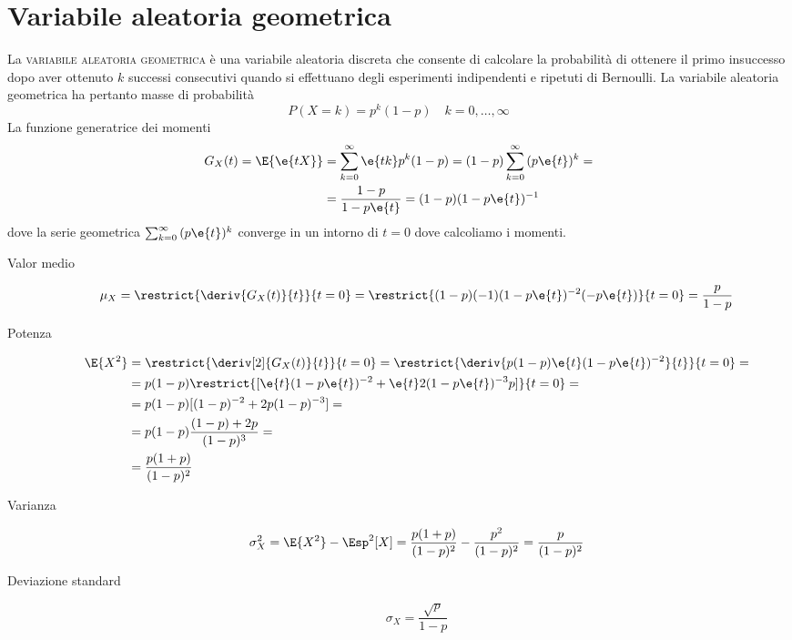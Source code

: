 \section{Variabile aleatoria geometrica}
La \textsc{variabile aleatoria geometrica} è una variabile aleatoria discreta che consente di calcolare la probabilità di ottenere il primo insuccesso dopo aver ottenuto $k$ successi consecutivi quando si effettuano degli esperimenti indipendenti e ripetuti di Bernoulli.
La variabile aleatoria geometrica ha pertanto masse di probabilità
\begin{equation}
	P(X=k)=p^k(1-p)\quad k=0,\dots,\infty
\end{equation}
La funzione generatrice dei momenti
\begin{equation}
\begin{split}
	G_X(t)=\E{\e{t X}}&=\sum_{k=0}^{\infty}{\e{t k}p^k(1-p)}=(1-p)\sum_{k=0}^{\infty}{(p\e{t})^k}=\\
	&=\frac{1-p}{1-p\e{t}}=(1-p)(1-p\e{t})^{-1}
\end{split}
\end{equation}
dove la serie geometrica $\sum_{k=0}^{\infty}{(p\e{t})^k}$ converge in un intorno di $t=0$ dove calcoliamo i momenti.

\begin{description}
\item[Valor medio]
\begin{equation}
	\mu_X=\restrict{\deriv{G_X(t)}{t}}{t=0}=\restrict{(1-p)(-1)(1-p\e{t})^{-2}(-p\e{t})}{t=0}=\frac{p}{1-p}
\end{equation}
\item[Potenza]
\begin{equation}
\begin{split}
	\E{X^2}&=\restrict{\deriv[2]{G_X(t)}{t}}{t=0}=\restrict{\deriv{p(1-p)\e{t}(1-p\e{t})^{-2}}{t}}{t=0}=\\
	&=p(1-p)\restrict{[\e{t}(1-p\e{t})^{-2}+\e{t}2(1-p\e{t})^{-3}p]}{t=0}=\\
	&=p(1-p)[(1-p)^{-2}+2p(1-p)^{-3}]=\\
	&=p(1-p)\frac{(1-p)+2p}{(1-p)^3}=\\
	&=\frac{p(1+p)}{(1-p)^2}
\end{split}
\end{equation}
\item[Varianza]
\begin{equation}
	\sigma^2_X=\E{X^2}-\Esp^2[X]=\frac{p(1+p)}{(1-p)^2}-\frac{p^2}{(1-p)^2}=\frac{p}{(1-p)^2}
\end{equation}
\item[Deviazione standard]
\begin{equation}
	\sigma_X=\frac{\sqrt{p}}{1-p}
\end{equation}
\end{description}

